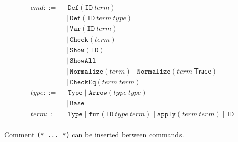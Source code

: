 \documentclass[runningheads]{llncs}
\begin{document}
\begin{align*}
    cmd ::=&\ \texttt{Def}(\texttt{ID}\ term) \\
        &|\ \texttt{Def}(\texttt{ID}\ term\ type) \\
        &|\ \texttt{Var}(\texttt{ID}\ term) \\
        &|\ \texttt{Check}(term) \\
        &|\ \texttt{Show}(\texttt{ID}) \\
        &|\ \texttt{ShowAll} \\
        &|\ \texttt{Normalize}(term) \mid \texttt{Normalize}(term\ \textsf{Trace}) \\
        &|\ \texttt{CheckEq}(term\ term) \\
    type ::=&\ \texttt{Type} \mid \texttt{Arrow}(type\ type) \\
            &|\ \texttt{Base} \\
    term ::=&\ \texttt{Type} \mid \texttt{fun}(\texttt{ID}\ type\ term) \mid \texttt{apply}(term\ term) \mid \texttt{ID} \\
\end{align*}

Comment \texttt{(* ... *)} can be inserted between commands.
\end{document}
